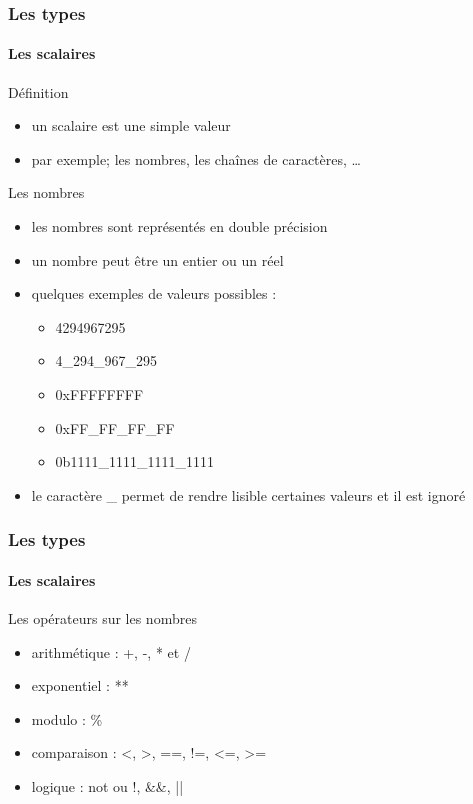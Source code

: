 \begin{frame}[fragile]
  \frametitle{Les types}
  \framesubtitle{Les scalaires}

  \begin{block}{Définition}
    \begin{itemize}
    \item un scalaire est une simple valeur
    \item par exemple; les nombres, les chaînes de caractères, \ldots
    \end{itemize}
  \end{block}

  \begin{exampleblock}{Les nombres}
    \begin{itemize}
    \item les nombres sont représentés en double précision
    \item un nombre peut être un entier ou un réel
    \item quelques exemples de valeurs possibles :
      \begin{itemize}
      \item 4294967295
      \item 4\_294\_967\_295
      \item 0xFFFFFFFF
      \item 0xFF\_FF\_FF\_FF
      \item 0b1111\_1111\_1111\_1111
      \end{itemize}
    \item le caractère \_ permet de rendre lisible certaines valeurs et il est
      ignoré
    \end{itemize}
  \end{exampleblock}

\end{frame}

\begin{frame}[fragile]
  \frametitle{Les types}
  \framesubtitle{Les scalaires}

  \begin{block}{Les opérateurs sur les nombres}
    \begin{itemize}
    \item arithmétique : +, -, * et /
    \item exponentiel : **
    \item modulo : \%
    \item comparaison : <, >, ==, !=, <=, >=
    \item logique : not ou !, \&\&, ||
    \end{itemize}
  \end{block}

\end{frame}

